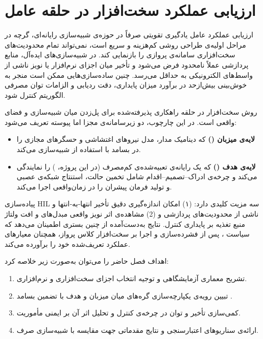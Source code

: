 \chapter{
	ارزیابی عملکرد سخت‌افزار در حلقه عامل
	}
	
	
	ارزیابی عملکرد عامل یادگیری تقویتی صرفاً در حوزه‌ی شبیه‌سازی رایانه‌ای، گرچه در مراحل اولیه‌ی طراحی روشی کم‌هزینه و سریع است، نمی‌تواند تمام محدودیت‌های سخت‌افزاری سامانه‌ی پروازی را بازنمایی کند. در شبیه‌سازی‌های ایده‌آل، منابع پردازشی عملاً نا‌محدود فرض می‌شود و تأخیر میان اجزای نرم‌افزار یا نویز ناشی از واسط‌های الکترونیکی به حداقل می‌رسد. چنین ساده‌سازی‌هایی ممکن است منجر به خوش‌بینی بیش‌ازحد در برآورد میزان پایداری، دقت ردیابی و الزامات توان مصرفی الگوریتم کنترل شود.
	
	روش سخت‌افزار در حلقه راهکاری پذیرفته‌شده برای پل‌زدن میان شبیه‌سازی و فضای واقعی است. در این چارچوب، دو زیرسامانه‌ی مجزا اما پیوسته تعریف می‌شود:
	
	\begin{itemize}
		\item \textbf{لایه‌ی میزبان ()} که دینامیک مدار، مدل نیروهای اغتشاشی و حسگرهای مجازی را در بسامد 
		 با استفاده از
		  شبیه‌سازی می‌کند.
		\item \textbf{لایه‌ی هدف ()} که یک رایانه‌ی تعبیه‌شده‌ی کم‌مصرف (در این پروژه، ) را نمایندگی می‌کند و چرخه‌ی {ادراک–تصمیم–اقدام} شامل تخمین حالت، استنتاج شبکه‌ی عصبی و تولید فرمان پیشران را در زمان‌واقعی اجرا می‌کند.
	\end{itemize}
	
	پیاده‌سازی HIL سه مزیت کلیدی دارد: (۱) امکان اندازه‌گیری دقیق تأخیر انتها‐به‐انتها و  ناشی از محدودیت‌های پردازشی و (2) مشاهده‌ی اثر نویز واقعی مبدل‌های  و افت ولتاژ منبع تغذیه بر پایداری کنترل.
	  نتایج به‌دست‌آمده از چنین بستری اطمینان می‌دهد که سیاست ، پس از فشرده‌سازی
	   و اجرا بر سخت‌افزار کلاس پرواز، همچنان معیارهای عملکرد تعریف‌شده خود را برآورده 
	   می‌کند.
	
	اهداف فصل حاضر را می‌توان به‌صورت زیر خلاصه کرد:
	\begin{enumerate}
		\item تشریح معماری آزمایشگاهی 
		 و توجیه انتخاب اجزای سخت‌افزاری و نرم‌افزاری.
		\item تبیین رویه‌ی یکپارچه‌سازی گره‌های  میان میزبان و هدف با تضمین بسامد .
		\item کمی‌سازی تأخیر و توان در چرخه‌ی کنترل و تحلیل اثر آن بر ایمنی مأموریت.
		\item ارائه‌ی سناریوهای اعتبارسنجی و نتایج مقدماتی جهت مقایسه با شبیه‌سازی صرف.
	\end{enumerate}
	
